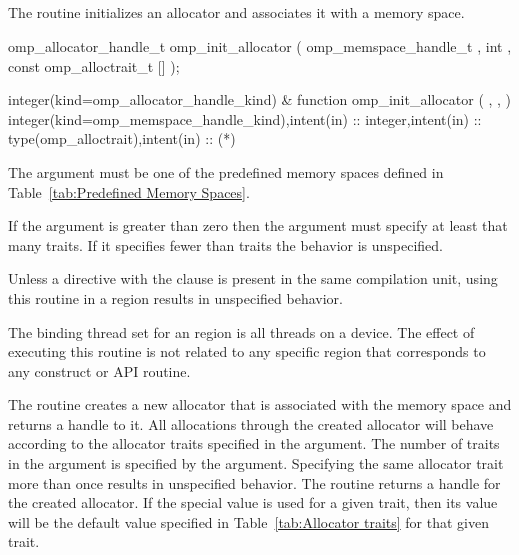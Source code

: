\subsection{}
\label{subsec:omp_init_allocator}

\summary
The  routine initializes an allocator and 
associates it with a memory space.

\format
\begin{ccppspecific}
\begin{ompcFunction}
omp_allocator_handle_t omp_init_allocator ( 
  omp_memspace_handle_t , 
  int , 
  const omp_alloctrait_t []
);
\end{ompcFunction}
\end{ccppspecific}
\begin{fortranspecific}
\begin{ompfFunction}
integer(kind=omp_allocator_handle_kind) &
function omp_init_allocator ( , ,  )
integer(kind=omp_memspace_handle_kind),intent(in) :: 
integer,intent(in) :: 
type(omp_alloctrait),intent(in) :: (*)
\end{ompfFunction}
\end{fortranspecific}

\constraints
The  argument must be one of the predefined memory 
spaces defined in Table~\ref{tab:Predefined Memory Spaces}.

If the  argument is greater than zero then the  
argument must specify at least that many traits. If it specifies fewer 
than  traits the behavior is unspecified.

Unless a  directive with the  
clause is present in the same compilation unit, using this routine in 
a  region results in unspecified behavior.

\binding
The binding thread set for an  region is all 
threads on a device. The effect of executing this routine is not related 
to any specific region that corresponds to any construct or API routine.

\effect
The  routine creates a new allocator that is 
associated with the  memory space and returns a handle to it. 
All allocations through the created allocator will behave according to 
the allocator traits specified in the  argument. The number 
of traits in the  argument is specified by the  
argument. Specifying the same allocator trait more than once results in 
unspecified behavior. The routine returns a handle for the created allocator. 
If the special  value is used for a given trait, 
then its value will be the default value specified in 
Table~\ref{tab:Allocator traits} for that given trait.

